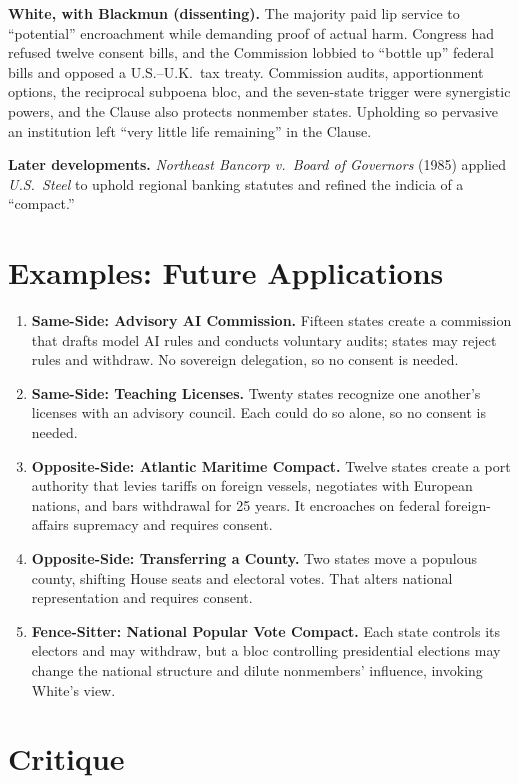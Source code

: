 \documentclass[12pt]{article}
\begin{document}
\textbf{White, with Blackmun (dissenting).} The majority paid lip service to ``potential'' encroachment while demanding proof of actual harm. Congress had refused twelve consent bills, and the Commission lobbied to ``bottle up'' federal bills and opposed a U.S.--U.K.\ tax treaty. Commission audits, apportionment options, the reciprocal subpoena bloc, and the seven-state trigger were synergistic powers, and the Clause also protects nonmember states. Upholding so pervasive an institution left ``very little life remaining'' in the Clause.

\textbf{Later developments.} \textit{Northeast Bancorp v.\ Board of Governors} (1985) applied \textit{U.S.\ Steel} to uphold regional banking statutes and refined the indicia of a ``compact.''

\section{Examples: Future Applications}

\begin{enumerate}
\item \textbf{Same-Side: Advisory AI Commission.} Fifteen states create a commission that drafts model AI rules and conducts voluntary audits; states may reject rules and withdraw. No sovereign delegation, so no consent is needed.
\item \textbf{Same-Side: Teaching Licenses.} Twenty states recognize one another's licenses with an advisory council. Each could do so alone, so no consent is needed.
\item \textbf{Opposite-Side: Atlantic Maritime Compact.} Twelve states create a port authority that levies tariffs on foreign vessels, negotiates with European nations, and bars withdrawal for 25 years. It encroaches on federal foreign-affairs supremacy and requires consent.
\item \textbf{Opposite-Side: Transferring a County.} Two states move a populous county, shifting House seats and electoral votes. That alters national representation and requires consent.
\item \textbf{Fence-Sitter: National Popular Vote Compact.} Each state controls its electors and may withdraw, but a bloc controlling presidential elections may change the national structure and dilute nonmembers' influence, invoking White's view.
\end{enumerate}

\section{Critique}
\end{document}
